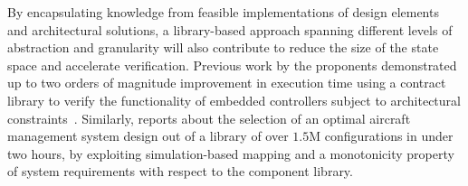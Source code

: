 By encapsulating knowledge from feasible implementations of design elements and architectural solutions, a library-based approach spanning different levels of abstraction and granularity will also contribute to reduce the size of the state space and accelerate verification. 
Previous work by the proponents demonstrated up to two orders of magnitude improvement in execution time using a contract library to verify the functionality of embedded controllers subject to architectural constraints~\cite{Iannopollo14}. Similarly, \cite{Finn15} reports about the selection of an optimal aircraft management system design out of a library of over $1.5$M configurations in under two hours, by exploiting simulation-based mapping and a monotonicity property of system requirements with respect to the component library.

